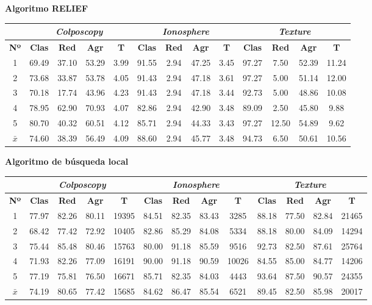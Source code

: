 \documentclass[12pt]{article}
\begin{document}
\newpage

\textbf{Algoritmo RELIEF}

\begin{table}[h]
\begin{tabular}{ccccc|cccc|cccc}
 & \multicolumn{4}{c}{\textit{Colposcopy}} & \multicolumn{4}{c}{\textit{Ionosphere}} & \multicolumn{4}{c}{\textit{Texture}} \\ \hline
\textbf{Nº} & \textbf{Clas} & \textbf{Red} & \textbf{Agr} & \textbf{T} & \textbf{Clas} & \textbf{Red} & \textbf{Agr} & \textbf{T} & \textbf{Clas} & \textbf{Red} & \textbf{Agr} & \textbf{T} \\ \hline
1 & 69.49 & 37.10 & 53.29 & 3.99 & 91.55 & 2.94 & 47.25 & 3.45 & 97.27 & 7.50 & 52.39 & 11.24\\
2 & 73.68 & 33.87 & 53.78 & 4.05 & 91.43 & 2.94 & 47.18 & 3.61 & 97.27 & 5.00 & 51.14 & 12.00\\
3 & 70.18 & 17.74 & 43.96 & 4.23 & 91.43 & 2.94 & 47.18 & 3.44 & 92.73 & 5.00 & 48.86 & 10.08\\
4 & 78.95 & 62.90 & 70.93 & 4.07 & 82.86 & 2.94 & 42.90 & 3.48 & 89.09 & 2.50 & 45.80 & 9.88\\
5 & 80.70 & 40.32 & 60.51 & 4.12 & 85.71 & 2.94 & 44.33 & 3.43 & 97.27 & 12.50 & 54.89 & 9.62\\
\hline
$\bar{x}$ & 74.60 & 38.39 & 56.49 & 4.09 & 88.60 & 2.94 & 45.77 & 3.48 & 94.73 & 6.50 & 50.61 & 10.56
\end{tabular}
\end{table}

\textbf{Algoritmo de búsqueda local}

\begin{table}[h]
\begin{tabular}{ccccc|cccc|cccc}
 & \multicolumn{4}{c}{\textit{Colposcopy}} & \multicolumn{4}{c}{\textit{Ionosphere}} & \multicolumn{4}{c}{\textit{Texture}} \\ \hline
\textbf{Nº} & \textbf{Clas} & \textbf{Red} & \textbf{Agr} & \textbf{T} & \textbf{Clas} & \textbf{Red} & \textbf{Agr} & \textbf{T} & \textbf{Clas} & \textbf{Red} & \textbf{Agr} & \textbf{T} \\ \hline
1 & 77.97 & 82.26 & 80.11 & 19395 & 84.51 & 82.35 & 83.43 & 3285 & 88.18 & 77.50 & 82.84 & 21465\\
2 & 68.42 & 77.42 & 72.92 & 10405 & 82.86 & 85.29 & 84.08 & 5334 & 88.18 & 80.00 & 84.09 & 14294\\
3 & 75.44 & 85.48 & 80.46 & 15763 & 80.00 & 91.18 & 85.59 & 9516 & 92.73 & 82.50 & 87.61 & 25764\\
4 & 71.93 & 82.26 & 77.09 & 16191 & 90.00 & 91.18 & 90.59 & 10026 & 84.55 & 85.00 & 84.77 & 14206\\
5 & 77.19 & 75.81 & 76.50 & 16671 & 85.71 & 82.35 & 84.03 & 4443 & 93.64 & 87.50 & 90.57 & 24355\\
\hline
$\bar{x}$  & 74.19 & 80.65 & 77.42 & 15685 & 84.62 & 86.47 & 85.54 & 6521 & 89.45 & 82.50 & 85.98 & 20017
\end{tabular}
\end{table}
\end{document}
